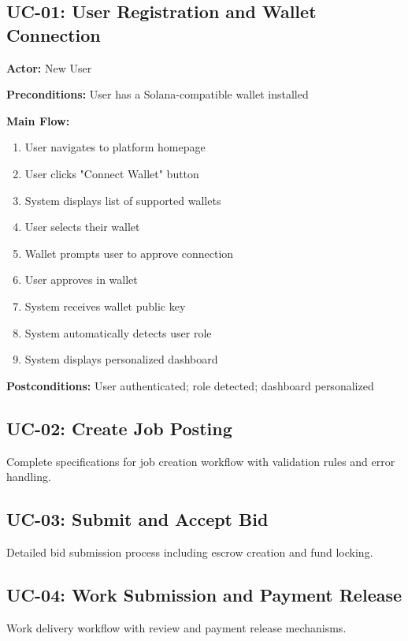 \documentclass[a4paper,13pt,twoside]{report}
\theoremstyle{definition}
\begin{document}
\subsection{UC-01: User Registration and Wallet Connection}

\textbf{Actor:} New User

\textbf{Preconditions:} User has a Solana-compatible wallet installed

\textbf{Main Flow:}
\begin{enumerate}
    \item User navigates to platform homepage
    \item User clicks "Connect Wallet" button
    \item System displays list of supported wallets
    \item User selects their wallet
    \item Wallet prompts user to approve connection
    \item User approves in wallet
    \item System receives wallet public key
    \item System automatically detects user role
    \item System displays personalized dashboard
\end{enumerate}

\textbf{Postconditions:} User authenticated; role detected; dashboard personalized

\subsection{UC-02: Create Job Posting}

Complete specifications for job creation workflow with validation rules and error handling.

\subsection{UC-03: Submit and Accept Bid}

Detailed bid submission process including escrow creation and fund locking.

\subsection{UC-04: Work Submission and Payment Release}

Work delivery workflow with review and payment release mechanisms.
\end{document}

